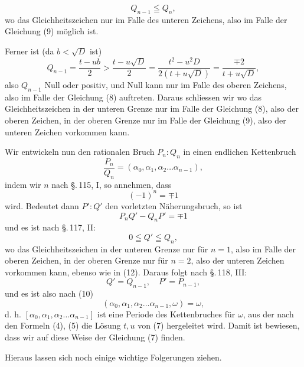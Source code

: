 \[
Q_{n-1} \leqq Q_n,
\]
wo das Gleichheitszeichen nur im Falle des unteren Zeichens,
also im Falle der Gleichung (9) möglich ist.

Ferner ist (da $b < \sqrt{D}$ ist)
\[
Q_{n-1} = \frac{t-ub}{2} > \frac{t-u\sqrt{D}}{2} = \frac{t^2-u^2D}{2(t+u\sqrt{D})} = \frac{\mp 2}{t+u\sqrt{D}},
\]
also $Q_{n-1}$ Null oder positiv, und Null kann nur im Falle des
oberen Zeichens, also im Falle der Gleichung (8) auftreten.
Daraus schliessen wir
wo das Gleichheitszeichen in der unteren Grenze nur im Falle
der Gleichung (8), also der oberen Zeichen, in der oberen Grenze
nur im Falle der Gleichung (9), also der unteren Zeichen vorkommen kann.

Wir entwickeln nun den rationalen Bruch $P_n : Q_n$ in einen
endlichen Kettenbruch
\[
\frac{P_n}{Q_n} = (\alpha_0, \alpha_1, \alpha_2 \ldots \alpha_{n-1}),
\]
indem wir $n$ nach \S.\,115, I, so annehmen, dass
\[
(-1)^n = \mp 1
\]
wird. Bedeutet dann $P' : Q'$ den vorletzten Näherungsbruch, so ist
\[
P_n Q' - Q_n P' = \mp 1
\]
und es ist nach \S.\,117, II:
\[
0 \leqq Q' \leqq Q_n,
\]
wo das Gleichheitszeichen in der unteren Grenze nur für $n=1$,
also im Falle der oberen Zeichen, in der oberen Grenze nur für
$n=2$, also der unteren Zeichen vorkommen kann, ebenso wie
in (12). Daraus folgt nach \S.\,118, III:
\[
Q' = Q_{n-1}, \quad P' = P_{n-1},
\]
und es ist also nach (10)
\[
(\alpha_0, \alpha_1, \alpha_2 \ldots \alpha_{n-1}, \omega) = \omega,
\]
d. h. $[\alpha_0, \alpha_1, \alpha_2 \ldots \alpha_{n-1}]$ ist eine Periode des Kettenbruches für
$\omega$, aus der nach den Formeln (4), (5) die Lösung $t, u$ von (7)
hergeleitet wird. Damit ist bewiesen, dass wir auf diese Weise
 der Gleichung (7) finden.

Hieraus lassen sich noch einige wichtige Folgerungen ziehen.
